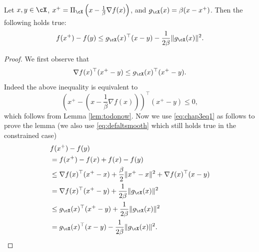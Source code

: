 \begin{lemma} \label{lem:smoothconst}
Let $x, y \in \cX$, $x^+ = \Pi_{\cX}\left(x - \frac{1}{\beta} \nabla f(x)\right)$, and $g_{\cX}(x) = \beta(x - x^+)$. Then the following holds true:
$$f(x^+) - f(y) \leq g_{\cX}(x)^{\top}(x-y) - \frac{1}{2 \beta} \|g_{\cX}(x)\|^2 .$$
\end{lemma}

\begin{proof}
We first observe that 
\begin{equation} \label{eq:chap3eq1}
\nabla f(x)^{\top} (x^+ - y) \leq g_{\cX}(x)^{\top}(x^+ - y) .
\end{equation}
Indeed the above inequality is equivalent to
$$\left(x^+- \left(x - \frac{1}{\beta} \nabla f(x) \right)\right)^{\top} (x^+ - y) \leq 0, $$
which follows from Lemma \ref{lem:todonow}. Now we use \eqref{eq:chap3eq1} as follows to prove the lemma (we also use \eqref{eq:defaltsmooth} which still holds true in the constrained case)
\begin{align*}
& f(x^+) - f(y) \\
& = f(x^+) - f(x) + f(x) - f(y) \\
& \leq \nabla f(x)^{\top} (x^+-x) + \frac{\beta}{2} \|x^+-x\|^2 + \nabla f(x)^{\top} (x-y) \\
& = \nabla f(x)^{\top} (x^+ - y) + \frac{1}{2 \beta} \|g_{\cX}(x)\|^2 \\
& \leq g_{\cX}(x)^{\top}(x^+ - y) + \frac{1}{2 \beta} \|g_{\cX}(x)\|^2 \\
& = g_{\cX}(x)^{\top}(x - y) - \frac{1}{2 \beta} \|g_{\cX}(x)\|^2 .
\end{align*}
\end{proof}
